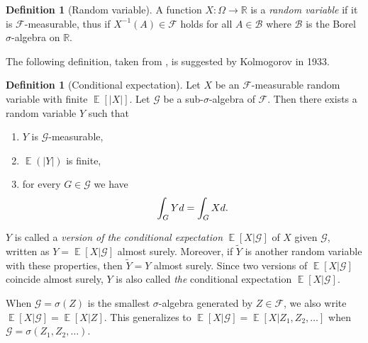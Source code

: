 \documentclass[twoside,a4paper]{article}
\theoremstyle{plain}
\theoremstyle{definition}
\newtheorem{definition}[theorem]{Definition}
\theoremstyle{remark}
\numberwithin{equation}{section}
\newcommand{\R}{\mathbb{R}}
\let\P\relax
\DeclareMathOperator{\P}{\mathbb{P}}
\DeclareMathOperator{\E}{\mathbb{E}}
\DeclareMathOperator{\1}{\mathbbm{1}}
\newcommand{\F}{\mathcal{F}}
\renewcommand{\G}{\mathcal{G}}
\newcommand{\B}{\mathcal{B}}
\begin{document}
\begin{definition}[Random variable]
A function $X\colon\Omega\to\R$ is a \emph{random variable} if it is $\F$-measurable, thus if $X^{-1}(A)\in\F$ holds for all $A\in\B$ where $\B$ is the Borel $\sigma$-algebra on $\R$.
\end{definition}

The following definition, taken from \cite{Williams91}, is suggested by Kolmogorov in 1933.

\begin{definition}[Conditional expectation]\label{def:conexp}
Let $X$ be an $\F$-measurable random variable with finite $\E[|X|]$. Let $\G$ be a sub-$\sigma$-algebra of $\F$. Then there exists a random variable $Y$ such that 
\begin{enumerate}
\item $Y$ is $\G$-measurable,
\item $\E(|Y|)$ is finite,
\item for every $G\in\G$ we have 
\[\int_G Yd\P=\int_G Xd\P.\]
\end{enumerate}
$Y$ is called a \emph{version of the conditional expectation} $\E[X|\G]$ of $X$ given $\G$, written as $Y=\E[X|\G]$ almost surely. Moreover, if $\tilde{Y}$ is another random variable with these properties, then $\tilde{Y}=Y$ almost surely. Since two versions of $\E[X|\G]$ coincide almost surely, $Y$ is also called \emph{the} conditional expectation $\E[X|\G]$.
\end{definition}
When $\G=\sigma(Z)$ is the smallest $\sigma$-algebra generated by $Z\in\F$, we also write $\E[X|\G]=\E[X|Z]$. This generalizes to $\E[X|\G]=\E[X|Z_1,Z_2,\ldots]$ when $\G=\sigma(Z_1,Z_2,\ldots)$.
\end{document}
